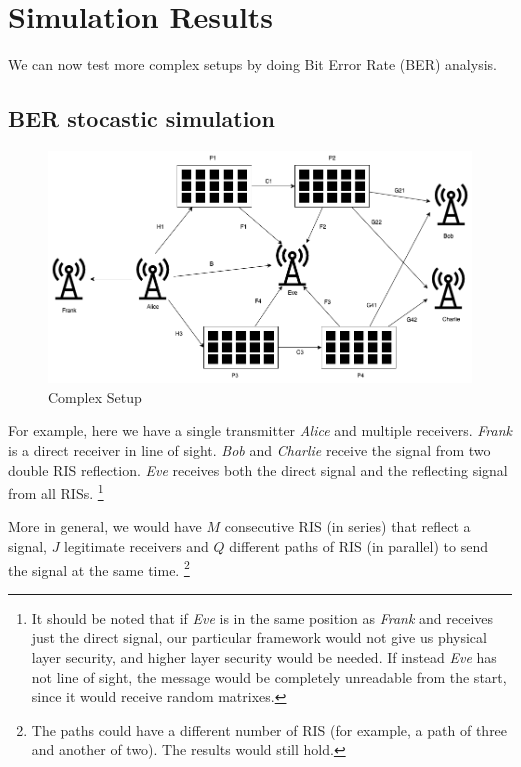 \section{Simulation Results}

We can now test more complex setups by doing Bit Error Rate (BER) analysis.

\subsection{BER stocastic simulation}

\begin{figure}[H]
  \centering
  \includegraphics[width=\linewidth]{imgs/complex-situation.png}
  \caption{Complex Setup}
  \label{fig:correlation_sk2}
\end{figure}

For example, here we have a single transmitter \textit{Alice} and multiple receivers. \textit{Frank} is a direct receiver in line of sight. \textit{Bob} and \textit{Charlie} receive the signal from two double RIS reflection. \textit{Eve} receives both the direct signal and the reflecting signal from all RISs. \footnote{It should be noted that if \textit{Eve} is in the same position as \textit{Frank} and receives just the direct signal, our particular framework would not give us physical layer security, and higher layer security would be needed. If instead \textit{Eve} has not line of sight, the message would be completely unreadable from the start, since it would receive random matrixes.}

More in general, we would have $M$ consecutive RIS (in series) that reflect a signal, $J$ legitimate receivers and $Q$ different paths of RIS (in parallel) to send the signal at the same time. \footnote{The paths could have a different number of RIS (for example, a path of three and another of two). The results would still hold.}

